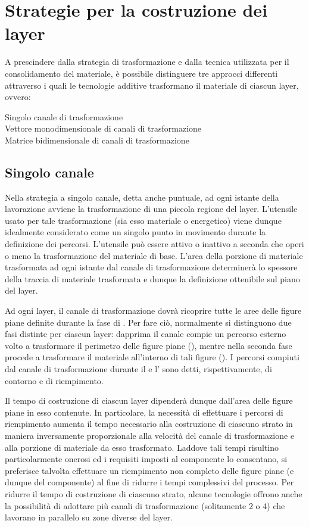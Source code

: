 \section{Strategie per la costruzione dei layer}
A prescindere dalla strategia di trasformazione e dalla tecnica utilizzata per il consolidamento del materiale, è possibile distinguere tre approcci differenti attraverso i quali le tecnologie additive trasformano il materiale di ciascun layer, ovvero:
\begin{description}
\item[Singolo canale di trasformazione]
\item[Vettore monodimensionale di canali di trasformazione]
\item[Matrice bidimensionale di canali di trasformazione]
\end{description}

\subsection{Singolo canale}
Nella strategia a singolo canale, detta anche puntuale, ad ogni istante della lavorazione avviene la trasformazione di una piccola regione del layer.
L'utensile usato per tale trasformazione (sia esso materiale o energetico) viene dunque idealmente considerato come un singolo punto in movimento durante la definizione dei percorsi.
L'utensile può essere attivo o inattivo a seconda che operi o meno la trasformazione del materiale di base.
L'area della porzione di materiale trasformata ad ogni istante dal canale di trasformazione determinerà lo spessore della traccia di materiale trasformata e dunque la definizione ottenibile sul piano del layer.

Ad ogni layer, il canale di trasformazione dovrà ricoprire tutte le aree delle figure piane definite durante la fase di .
Per fare ciò, normalmente si distinguono due fasi distinte per ciascun layer: dapprima il canale compie un percorso esterno volto a trasformare il perimetro delle figure piane (), mentre nella seconda fase procede a trasformare il materiale all'interno di tali figure ().
I percorsi compiuti dal canale di trasformazione durante il  e l' sono detti, rispettivamente, di contorno e di riempimento.

Il tempo di costruzione di ciascun layer dipenderà dunque dall'area delle figure piane in esso contenute.
In particolare, la necessità di effettuare i percorsi di riempimento aumenta il tempo necessario alla costruzione di ciascuno strato in maniera inversamente proporzionale alla velocità del canale di trasformazione e alla porzione di materiale da esso trasformato.
Laddove tali tempi risultino particolarmente onerosi ed i requisiti imposti al componente lo consentano, si preferisce talvolta effettuare un riempimento non completo delle figure piane (e dunque del componente) al fine di ridurre i tempi complessivi del processo.
Per ridurre il tempo di costruzione di ciascuno strato, alcune tecnologie offrono anche la possibilità di adottare più canali di trasformazione (solitamente 2 o 4) che lavorano in parallelo su zone diverse del layer.


